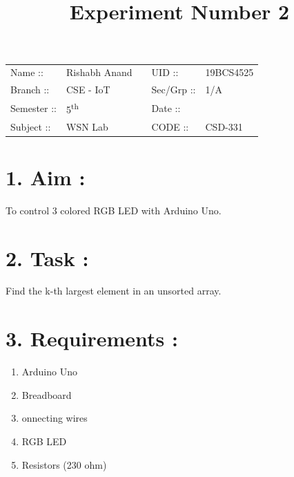 \documentclass[14pt]{extarticle}
\title{%
    \textbf{
    \vspace{-3em} \\ 
    \Large Experiment Number 2\\
    \vspace{-4em}
    }
}
\author{}
\date{}
\begin{document}
\maketitle %

\section*{}
    \begin{tabular}{ llp{2cm}ll } 
        Name :: & Rishabh Anand & & UID :: & 19BCS4525  \\ 
        Branch :: & CSE - IoT & & Sec/Grp :: & 1/A \\ 
        Semester :: & 5\textsuperscript{th} & & Date :: & \shortdate{\today} \\
        Subject :: & WSN Lab & & CODE :: & CSD-331  \\ 
    \end{tabular}
    
\vspace{1em}

\section*{\normalsize 1. Aim :}
    
To control 3 colored RGB LED with Arduino Uno.

\section*{\normalsize 2. Task :}
    
Find the k-th largest element in an unsorted array.

\section*{\normalsize 3. Requirements :}
    
    \begin{enumerate}
      \item Arduino Uno
      \item Breadboard
      \item onnecting wires
      \item RGB LED
      \item Resistors (230 ohm)
    \end{enumerate}
\end{document}
